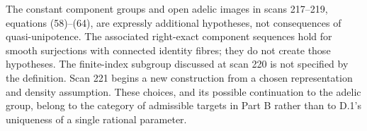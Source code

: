 The constant component groups and open adelic images in scans
217--219, equations (58)--(64), are expressly additional hypotheses,
not consequences of quasi-unipotence.  The associated right-exact
component sequences hold for smooth surjections with connected
identity fibres; they do not create those hypotheses.  The
finite-index subgroup discussed at scan 220 is not specified by
the definition.  Scan 221 begins a new construction from a chosen
representation and density assumption.  These choices, and its
possible continuation to the adelic group, belong to the category
of admissible targets in Part B rather than to D.1's uniqueness
of a single rational parameter.
